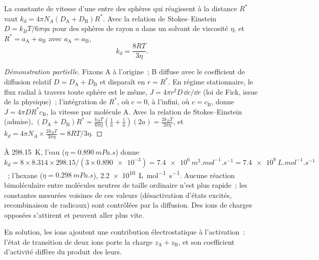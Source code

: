 \begin{proposition}\label{prop:b3:rate-theories:smoluchowski}
La constante de vitesse d'une  entre
des sphères qui réagissent à la distance $R^*$ vaut
$k_d = 4\pi N_A(D_{\mathrm A} + D_{\mathrm B})R^*$. Avec la relation de
Stokes--Einstein
$D = k_BT/6\pi\eta a$ pour des sphères de rayon $a$ dans un solvant de
viscosité $\eta$,
et $R^* = a_{\mathrm A} + a_{\mathrm B}$ avec $a_{\mathrm A} = a_{\mathrm B}$,
\[
  k_d = \frac{8RT}{3\eta} .
\]
\end{proposition}

\begin{proof}[Démonstration partielle]
Fixons A à l'origine~; B diffuse avec le coefficient de diffusion relatif $D =
D_{\mathrm A} + D_{\mathrm B}$ et disparaît en $r = R^*$. En régime
stationnaire, le flux radial à travers toute sphère est le même,
$J = 4\pi r^2D\,\dd c/\dd r$ (loi de Fick, issue de la physique)~;
l'intégration de $R^*$, où $c = 0$, à l'infini, où $c = c_{\mathrm B}$,
donne
$J = 4\pi DR^*c_{\mathrm B}$, la vitesse par molécule A. Avec la relation
de Stokes--Einstein (admise),
$(D_{\mathrm A} + D_{\mathrm B})R^* = \frac{k_BT}{6\pi\eta}(\frac{1}{a} + \frac1a)(2a) = \frac{2k_BT}{3\pi\eta}$, et $k_d = 4\pi N_A \times
\frac{2k_BT}{3\pi\eta} = 8RT/3\eta$.
\end{proof}

\begin{example}\label{ex:b3:rate-theories:speed-limit}
À \qty{298.15}{K}, l'eau ($\eta = \qty{0.890}{mPa.s}$) donne $k_d = 8 \times 8.314 \times
298.15/(3 \times \num{0.890e-3}) = \qty{7.4e6}{m^3.mol^{-1}.s^{-1}} = \qty{7.4e9}{L.mol^{-1}.s^{-1}}$~;
l'hexane
($\eta = \qty{0.298}{mPa.s}$), \qty{2.2e10}{L.mol^{-1}.s^{-1}}. Aucune
réaction bimoléculaire entre molécules neutres de taille ordinaire n'est
plus rapide~; les constantes mesurées voisines de ces valeurs
(désactivation d'états excités, recombinaison de radicaux) sont
contrôlées par la diffusion. Des ions de charges opposées s'attirent et
peuvent aller plus vite.
\end{example}

En solution, les ions ajoutent une contribution électrostatique à
l'activation~: l'état de transition de deux ions porte la charge
$z_{\mathrm A} + z_{\mathrm B}$, et son coefficient d'activité diffère du
produit des leurs.

